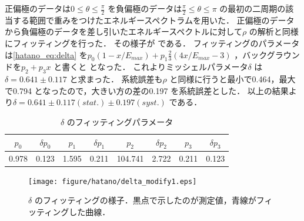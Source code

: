 正偏極のデータは$0\leq\theta\leq\frac{\pi}{2}$ を負偏極のデータは$\frac{\pi}{2}\leq\theta\leq\pi$ の最初の二周期の該当する範囲で重みをつけたエネルギースペクトラムを用いた．
正偏極のデータから負偏極のデータを差し引いたエネルギースペクトルに対して$\rho$ の解析と同様にフィッティングを行った．
その様子が である．
フィッティングのパラメータは\eqref{hatano_eq:delta} を$p_0(1-x/E_{max})+p_1\frac{2}{3}(4x/E_{max}-3)$ ，バックグラウンドを$p_2+p_3x$ と書くと となった．
これよりミッシェルパラメータ$\delta$ は$\delta=0.641\pm0.117$ と求まった．
系統誤差も$\rho$ と同様に行うと最小で0.464，最大で0.794 となったので，大きい方の差の0.197 を系統誤差とした．
以上の結果より$\delta=0.641\pm0.117 (stat.) \pm0.197 (syst.)$ である．

\begin{table}[hbt]
\centering
\caption{$\delta$ のフィッティングパラメータ}
\begin{tabular}{cc|cc|cc|cc}
$p_0$ & $\delta p_0$ & $p_1$ & $\delta p_1$ & $p_2$ & $\delta p_2$ & $p_3$ & $\delta p_3$ \\ \hline
0.978 & 0.123 & 1.595 & 0.211 & 104.741 & 2.722 & 0.211 & 0.123 \\
\end{tabular}
\label{hatano_tab:delta}
\end{table}

\begin{figure}[hbt]
\centering
\texttt{[image: figure/hatano/delta\_modify1.eps]}
\caption{$\delta$ のフィッティングの様子．黒点で示したのが測定値，青線がフィッティングした曲線．}
\label{hatano_fig:delta}
\end{figure}

%
